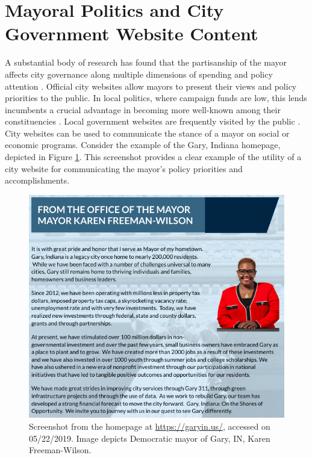 \documentclass[11pt]{article}
\begin{document}
\section{Mayoral Politics and City Government Website Content}


 A substantial body of research has found that the partisanship of the mayor affects city governance along multiple dimensions of spending and policy attention \citep{gerber2011mayors,de2016mayoral,einstein2016mayors,marion2013mayor}. Official city websites allow mayors to present their views and policy priorities to the public. In local politics, where campaign funds are low, this lends incumbents a crucial advantage in becoming more well-known among their constituencies \citep{stanyer2008elected}. Local government websites are frequently visited by the public \citep{thomas2003new}. City websites can be used to communicate the stance of a mayor on social or economic programs. Consider the example of the Gary, Indiana homepage, depicted in Figure \ref{fig:garymayor}.  This screenshot provides a clear example of the utility of a city website for communicating the mayor's policy priorities and accomplishments.
 
\begin{figure}
\centering
\includegraphics[scale=0.45]{figures/gary_hp}
\caption{Screenshot from the homepage at \url{https://garyin.us/}, accessed on 05/22/2019. Image depicts Democratic mayor of Gary, IN, Karen Freeman-Wilson.}
\label{fig:garymayor}
\end{figure}
\end{document}
